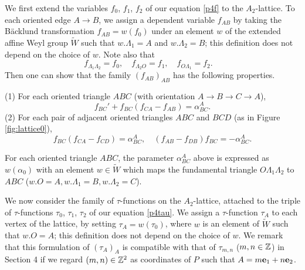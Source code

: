 {We first extend the variables $f_0$, $f_1$, $f_2$ of our 
equation \eqref{p4f} to the $A_2$-lattice. 
To each oriented edge $A\to B$, 
we assign  a dependent variable $f_{AB}$ by taking the 
B\"acklund transformation 
$f_{AB}=w(f_0)$ under an element $w$ of the extended 
affine Weyl group $\widetilde{W}$ 
such that $w.\Lambda_1=A$ and $w.\Lambda_2=B$; 
this definition does not depend on the choice of $w$. 
Note also that
\begin{equation}
f_{\Lambda_1\Lambda_2}=f_0,\quad
f_{\Lambda_2O}=f_1,\quad
f_{O\Lambda_1}=f_2.\quad
\end{equation}
Then one can show that the family $(f_{AB})_{AB}$ has the 
following properties. 
\par\medskip\noindent
(1)  For each oriented triangle $ABC$ (with orientation
$A\to B\to C\to A$), 
\begin{equation}\label{p4flat1}
f_{BC}'+f_{BC}(f_{CA}-f_{AB})=\alpha^A_{BC}. 
\end{equation}
(2) For each pair of adjacent oriented triangles 
$ABC$ and $BCD$ (as in Figure \ref{fig:lattice0}), 
\begin{equation}\label{p4flat2} 
f_{BC}(f_{CA}-f_{CD})=\alpha^A_{BC},\quad 
(f_{AB}-f_{DB})f_{BC}=-\alpha^A_{BC}. 
\end{equation}
\par\smallskip\noindent
For each oriented triangle $ABC$, 
the parameter $\alpha^A_{BC}$ above is expressed as $w(\alpha_0)$ 
with an element $w\in\widetilde{W}$ which maps the fundamental 
triangle $O\Lambda_1\Lambda_2$ to $ABC$ 
($w.O=A, w.\Lambda_1=B, w.\Lambda_2=C$). 
\par\medskip
We now consider the family of $\tau$-functions 
on the $A_2$-lattice, attached to 
the triple of $\tau$-functions $\tau_0$, $\tau_1$, 
$\tau_2$ of our equation \eqref{p4tau}.
We assign a $\tau$-function $\tau_A$ to each vertex of the lattice, 
by setting $\tau_A=w(\tau_0)$, where $w$ is an element of 
$\widetilde{W}$ such that $w.O=A$; 
this definition does not depend on the choice of $w$.
We remark that this formulation of $(\tau_A)_{A}$ is compatible 
with that of $\tau_{m,n}$ ($m,n\in{\Bbb Z}$) in Section 4 if we 
regard $(m,n)\in{\Bbb Z}^2$ as coordinates of $P$ such 
that $A=m\mbox{\bf e}_1+n\mbox{\bf e}_2$. 
}
